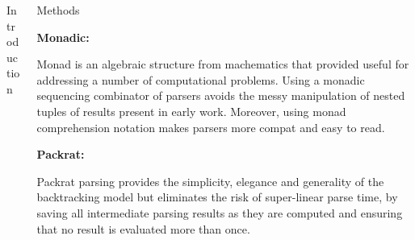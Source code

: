 \documentclass[final]{beamer}
\newlength{\onecolwid}
\newlength{\twocolwid}
\begin{document}
\begin{frame}[t]
\begin{columns}[t]
\begin{column}{\twocolwid}
\begin{columns}[t,totalwidth=\twocolwid]
\begin{column}{\onecolwid}
\begin{block}{Introduction}

\end{block}


\end{column} %

\begin{column}{\onecolwid}\vspace{-.6in} %


\begin{block}{Methods}

\textbf{Monadic:}

Monad is an algebraic structure from machematics that provided useful for addressing a
number of computational problems. Using a monadic sequencing combinator of parsers avoids
the messy manipulation of nested tuples of results present in early work. Moreover, using
monad comprehension notation makes parsers more compat and easy to read.

\textbf{Packrat:}

Packrat parsing provides the simplicity, elegance and generality of the backtracking model but eliminates the risk of super-linear parse time, by saving all intermediate parsing results as they are computed and ensuring that no result is evaluated more than once.




\end{block}
\end{column}
\end{columns}
\end{column}
\end{columns}
\end{frame}
\end{document}
